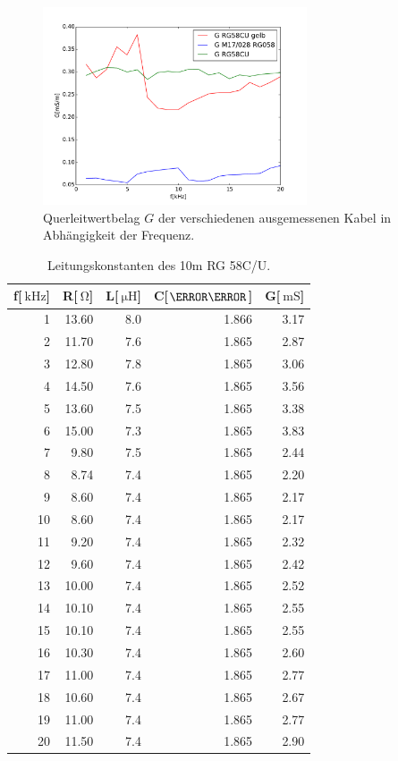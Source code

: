 \begin{figure}
\begin{minipage}{7.8cm}
	\end{minipage}
	\begin{minipage}{7.8cm}
		\includegraphics[width = 7.8cm]{data/a/G.pdf}
		\caption[]{Querleitwertbelag $G$ der verschiedenen ausgemessenen Kabel in Abhängigkeit der Frequenz.}
		\label{fig_konst4}
	\end{minipage}
\end{figure}

\begin{table}
\centering
	\caption[]{Leitungskonstanten des 10m RG 58C/U.}
	\begin{tabular}{r r r r r}
		f[$\SI{}{\kilo\hertz}$] & R[$\SI{}{\ohm}$] & L[$\SI{}{\micro\henry}$] & C[$\nano\farad$] & G[$\SI{}{\milli\siemens}$]\\
		\hline \hline
		  1	&	13.60	&	8.0	&	1.866	&	3.17\\
		  2	&	11.70	&	7.6	&	1.865	&	2.87\\
		  3	&	12.80	&	7.8	&	1.865	&	3.06\\
		  4	&	14.50	&	7.6	&	1.865	&	3.56\\
		  5	&	13.60	&	7.5	&	1.865	&	3.38\\
		  6	&	15.00	&	7.3	&	1.865	&	3.83\\
		  7	&	 9.80	&	7.5	&	1.865	&	2.44\\
		  8	&	 8.74	&	7.4	&	1.865	&	2.20\\
		  9	&	 8.60	&	7.4	&	1.865	&	2.17\\
		 10	&	 8.60	&	7.4	&	1.865	&	2.17\\
		 11	&	 9.20	&	7.4	&	1.865	&	2.32\\
		 12	&	 9.60	&	7.4	&	1.865	&	2.42\\
		 13	&	10.00	&	7.4	&	1.865	&	2.52\\
		 14	&	10.10	&	7.4	&	1.865	&	2.55\\
		 15	&	10.10	&	7.4	&	1.865	&	2.55\\
		 16	&	10.30	&	7.4	&	1.865	&	2.60\\
		 17	&	11.00	&	7.4	&	1.865	&	2.77\\
		 18	&	10.60	&	7.4	&	1.865	&	2.67\\
		 19	&	11.00	&	7.4	&	1.865	&	2.77\\
		 20	&	11.50	&	7.4	&	1.865	&	2.90\\
			\hline
	\end{tabular}
	\label{tab_konst1}
\end{table}

